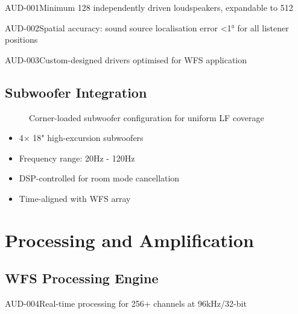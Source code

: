 \begin{requirement}{AUD-001}{Minimum 128 independently driven loudspeakers, expandable to 512}
\begin{requirement}{AUD-002}{Spatial accuracy: sound source localisation error <1° for all listener positions}
\begin{requirement}{AUD-003}{Custom-designed drivers optimised for WFS application}
\subsection{Subwoofer Integration}

\begin{figure}[H]
\centering
{}
\caption{Corner-loaded subwoofer configuration for uniform LF coverage}
\end{figure}

\begin{itemize}
    \item 4× 18" high-excursion subwoofers
    \item Frequency range: 20Hz - 120Hz
    \item DSP-controlled for room mode cancellation
    \item Time-aligned with WFS array
\end{itemize}

\section{Processing and Amplification}

\subsection{WFS Processing Engine}

\begin{requirement}{AUD-004}{Real-time processing for 256+ channels at 96kHz/32-bit}


\end{requirement}
\end{requirement}
\end{requirement}
\end{requirement}
